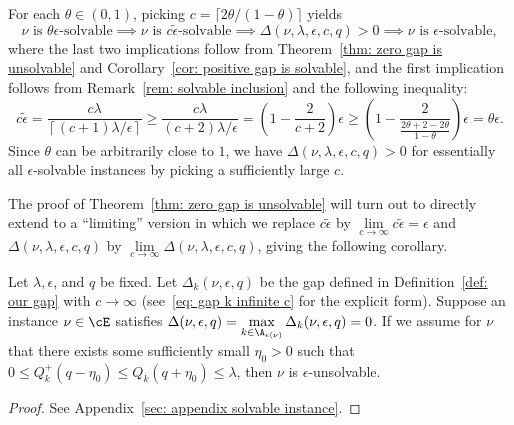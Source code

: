  
\begin{remark}
\label{rem: picking large enough c}
 For each $\theta \in (0, 1)$, picking $c = \lceil 2\theta / (1-\theta)\rceil$ yields
\begin{equation}
       \nu \text{ is } \theta\epsilon\text{-solvable} 
    \implies
    \nu \text{ is } c\tilde{\epsilon}\text{-solvable}
    \implies
     \Delta(\nu, \lambda, \epsilon, c, q) > 0
     \implies 
     \nu \text{ is } \epsilon\text{-solvable},
\end{equation}
where the last two implications follow from Theorem~\ref{thm: zero gap is unsolvable} and Corollary~\ref{cor: positive gap is solvable}, and the first implication follows from Remark~\ref{rem: solvable inclusion} and the following inequality:
\begin{equation}
    c \tilde{\epsilon} 
    = 
    \frac{c \lambda}{ \left\lceil (c+1) \lambda/\epsilon \right\rceil}
    \ge
     \frac{c \lambda}{  (c+2) \lambda / \epsilon }
     = 
     \left(1 - \frac{2}{c+2} \right) \epsilon
     \ge
     \left(1 - \frac{2}{\frac{2\theta+2-2\theta}{1-\theta}} \right) \epsilon
     = \theta \epsilon.
\end{equation} 
Since $\theta$ can be arbitrarily close to $1$,
we have $\Delta(\nu, \lambda, \epsilon, c, q) > 0$
     for essentially all $\epsilon$-solvable instances by picking a sufficiently large $c$.
 \end{remark}

The proof of Theorem~\ref{thm: zero gap is unsolvable} will turn out to directly extend to a ``limiting'' version in which we replace $c\tilde{\epsilon}$ by $\lim\limits_{c \to \infty} c\tilde{\epsilon} = \epsilon$ and $\Delta(\nu, \lambda, \epsilon, c, q)$ by $\lim\limits_{c \to \infty} \Delta(\nu, \lambda, \epsilon, c, q)$, giving the following corollary.


 \begin{corollary}
 \label{cor: zero gap is unsolvable}
    Let $\lambda, \epsilon$, and $q$ be fixed.
    Let $\Delta_{k}(\nu, \epsilon, q)$ be the gap defined in Definition~\ref{def: our gap} with $c \to \infty$ (see~\eqref{eq: gap k infinite c} for the explicit form).    
    Suppose an instance $\nu \in \cE$ satisfies $\Delta(\nu, \epsilon, q) = \max\limits_{k \in \A_{\epsilon(\nu)}} \Delta_k(\nu, \epsilon, q) = 0$.
    If we assume for $\nu$ that there exists some sufficiently small $\eta_0 > 0$ such that 
    $0 \le Q_k^+(q-\eta_0) \le Q_k(q+\eta_0) \le \lambda$, then $\nu$ is $\epsilon$-unsolvable.
 \end{corollary}
 \begin{proof}
    See Appendix~\ref{sec: appendix solvable instance}.
\end{proof}